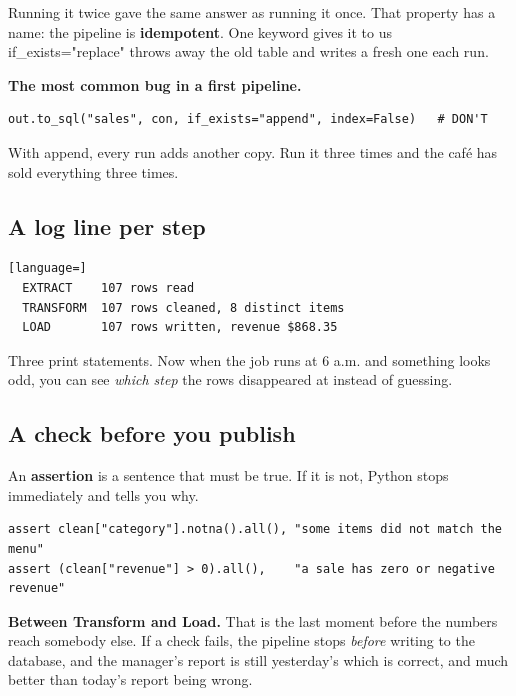 \documentclass[11pt,letterpaper]{article}
\newcommand{\py}[1]{{\ttfamily\small#1}}
\begin{document}
Running it twice gave the same answer as running it once. That property has a name: the pipeline is
\textbf{idempotent}. One keyword gives it to us \textemdash{} \py{if\_exists="replace"} throws away
the old table and writes a fresh one each run.

\begin{trap}
\small
\textbf{The most common bug in a first pipeline.}
\begin{lstlisting}
out.to_sql("sales", con, if_exists="append", index=False)   # DON'T
\end{lstlisting}
With \py{append}, every run adds another copy. Run it three times and the caf\'e has sold everything
three times.
\end{trap}

\subsection{A log line per step}

\begin{lstlisting}[language=]
  EXTRACT    107 rows read
  TRANSFORM  107 rows cleaned, 8 distinct items
  LOAD       107 rows written, revenue $868.35
\end{lstlisting}

Three \py{print} statements. Now when the job runs at 6 a.m. and something looks odd, you can see
\emph{which step} the rows disappeared at instead of guessing.

\subsection{A check before you publish}

An \textbf{assertion} is a sentence that must be true. If it is not, Python stops immediately and
tells you why.

\begin{lstlisting}
assert clean["category"].notna().all(), "some items did not match the menu"
assert (clean["revenue"] > 0).all(),    "a sale has zero or negative revenue"
\end{lstlisting}

\begin{greenbox}[title={Where the checks go}]
\small
\textbf{Between Transform and Load.} That is the last moment before the numbers reach somebody else.
If a check fails, the pipeline stops \emph{before} writing to the database, and the manager's report
is still yesterday's \textemdash{} which is correct, and much better than today's report being wrong.
\end{greenbox}
\end{document}
